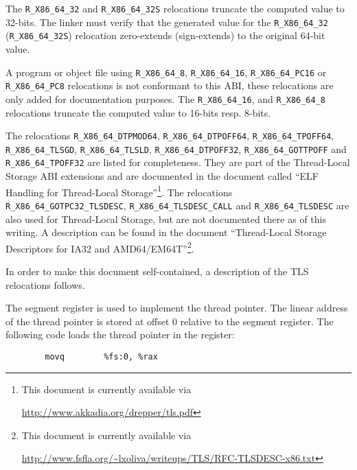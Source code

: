 \begin{sloppypar}
The \texttt{R_X86_64_32} and \texttt{R_X86_64_32S} relocations truncate
the computed value to 32-bits.  The linker must verify that the
generated value for the \texttt{R_X86_64_32} (\texttt{R_X86_64_32S})
relocation zero-extends (sign-extends) to the original 64-bit value.
\end{sloppypar}

\begin{sloppypar}
A program or object file using \texttt{R_X86_64_8},
\texttt{R_X86_64_16}, \texttt{R_X86_64_PC16} or \texttt{R_X86_64_PC8}
relocations is not conformant to this ABI, these relocations are only
added for documentation purposes.  The \texttt{R_X86_64_16}, and
\texttt{R_X86_64_8} relocations truncate the computed value to 16-bits
resp. 8-bits.
\end{sloppypar}

\begin{sloppypar}
The relocations \texttt{R_X86_64_DTPMOD64},
\texttt{R_X86_64_DTPOFF64}, \texttt{R_X86_64_TPOFF64},
\texttt{R_X86_64_TLSGD}, \texttt{R_X86_64_TLSLD},
\texttt{R_X86_64_DTPOFF32}, \texttt{R_X86_64_GOTTPOFF} and
\texttt{R_X86_64_TPOFF32} are listed for completeness.  They are part
of the Thread-Local Storage ABI extensions and are documented in the
document called ``ELF Handling for Thread-Local
Storage''\footnote{This document is currently available via
  \raggedright\url{http://www.akkadia.org/drepper/tls.pdf}}.  The relocations \texttt{R_X86_64_GOTPC32_TLSDESC},
\texttt{R_X86_64_TLSDESC_CALL} and \texttt{R_X86_64_TLSDESC} are also
used for Thread-Local Storage, but are not documented there as of this
writing.  A description can be found in the document ``Thread-Local
Storage Descriptors for IA32 and AMD64/EM64T''\footnote{This document
  is currently available via
  \raggedright\url{http://www.fsfla.org/~lxoliva/writeups/TLS/RFC-TLSDESC-x86.txt}}.
\end{sloppypar}

In order to make this document self-contained, a description of the
TLS relocations follows.

The  segment register is used to implement the thread pointer.
The linear address of the thread pointer is stored at offset 0 relative
to the  segment register.  The following code loads the thread
pointer in the  register:

\begin{footnotesize}
\begin{verbatim}
        movq        %fs:0, %rax
\end{verbatim}
\end{footnotesize}

